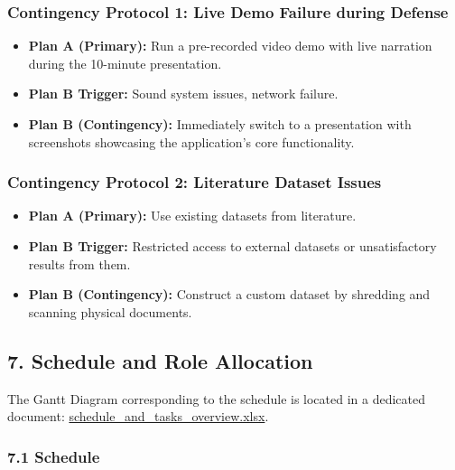 \documentclass[
]{article}
\providecommand{\tightlist}{%
  \setlength{\itemsep}{0pt}\setlength{\parskip}{0pt}}
\begin{document}
\subsubsection{\texorpdfstring{\textbf{Contingency Protocol 1: Live Demo
Failure during
Defense}}{Contingency Protocol 1: Live Demo Failure during Defense}}\label{contingency-protocol-1-live-demo-failure-during-defense}

\begin{itemize}
\tightlist
\item
  \textbf{Plan A (Primary):} Run a pre-recorded video demo with live
  narration during the 10-minute presentation.
\item
  \textbf{Plan B Trigger:} Sound system issues, network failure.
\item
  \textbf{Plan B (Contingency):} Immediately switch to a presentation
  with screenshots showcasing the application's core functionality.
\end{itemize}

\subsubsection{\texorpdfstring{\textbf{Contingency Protocol 2:
Literature Dataset
Issues}}{Contingency Protocol 2: Literature Dataset Issues}}\label{contingency-protocol-2-literature-dataset-issues}

\begin{itemize}
\tightlist
\item
  \textbf{Plan A (Primary):} Use existing datasets from literature.
\item
  \textbf{Plan B Trigger:} Restricted access to external datasets or
  unsatisfactory results from them.
\item
  \textbf{Plan B (Contingency):} Construct a custom dataset by shredding
  and scanning physical documents.
\end{itemize}

\subsection{7. Schedule and Role
Allocation}\label{schedule-and-role-allocation}

The Gantt Diagram corresponding to the schedule is located in a
dedicated document:
\href{https://github.com/zalewskaz/Fragmented-Document-Reconstruction/blob/main/docs/schedule_and_tasks_overview.xlsx}{schedule\_and\_tasks\_overview.xlsx}.

\subsubsection{7.1 Schedule}\label{schedule}
\end{document}
